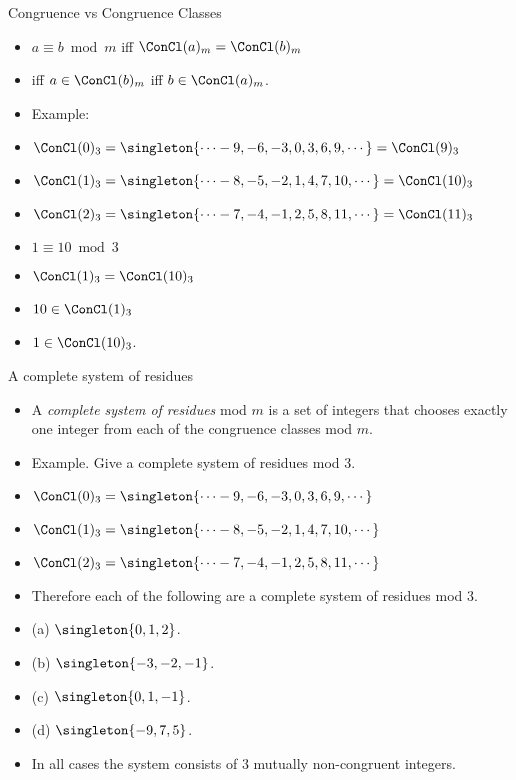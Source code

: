 \documentclass{beamer}
\begin{document}
\begin{frame}{Congruence vs Congruence Classes}

\begin{itemize}
  \item  $a\equiv b \bmod m$ iff $\ConCl(a)_m = \ConCl(b)_m$
  \item iff $a\in\ConCl(b)_m$ iff $b\in\ConCl(a)_m$.
  \item Example:
  \item $\ConCl(0)_3 = \singleton{\cdots -9, -6, -3, 0, 3, 6, 9,\cdots} = \ConCl(9)_3$
  \item $\ConCl(1)_3 = \singleton{\cdots -8, -5, -2, 1, 4, 7, 10,\cdots} = \ConCl(10)_3$
  \item $\ConCl(2)_3 = \singleton{\cdots -7, -4, -1, 2, 5, 8, 11,\cdots} = \ConCl(11)_3$
  \item $1 \equiv 10 \bmod 3$
  \item $\ConCl(1)_3 = \ConCl(10)_3$
  \item $10\in\ConCl(1)_3$
  \item $1\in\ConCl(10)_3$.
\end{itemize}

\end{frame}

\begin{frame}{A complete system of residues}

\begin{itemize}
  \item  A \emph{complete system of residues}  mod $m$ is a set of integers that
  chooses exactly one integer from each of the congruence classes mod $m$.
  \item Example. Give a complete system of residues mod $3$.
  \item $\ConCl(0)_3 = \singleton{\cdots -9, -6, -3, 0, 3, 6, 9,\cdots}$
  \item $\ConCl(1)_3 = \singleton{\cdots -8, -5, -2, 1, 4, 7, 10,\cdots}$
  \item $\ConCl(2)_3 = \singleton{\cdots -7, -4, -1, 2, 5, 8, 11,\cdots}$
  \item Therefore each of the following are a complete system of residues mod 3.
  \item (a) $\singleton{0,1,2}$.
  \item (b) $\singleton{-3,-2,-1}$.
  \item (c) $\singleton{0,1,-1}$.
  \item (d) $\singleton{-9,7,5}$.
  \item In all cases the system consists of 3 mutually non-congruent integers.
\end{itemize}

\end{frame}
\end{document}
